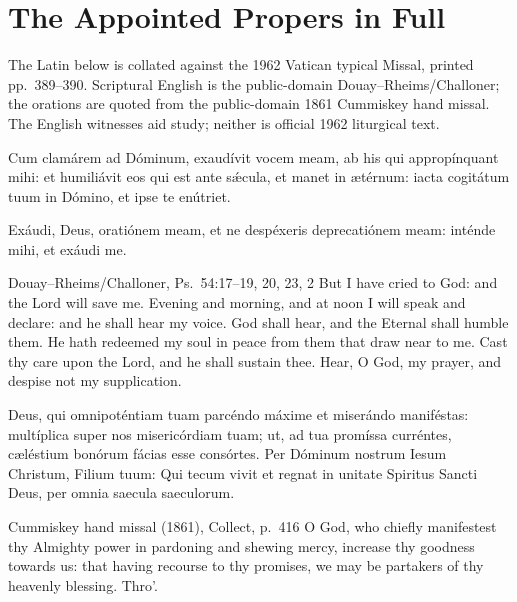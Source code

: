 \section*{The Appointed Propers in Full}

\noindent The Latin below is collated against the 1962 Vatican typical Missal,
printed pp.~389--390. Scriptural English is the public-domain
Douay--Rheims/Challoner; the orations are quoted from the public-domain 1861
Cummiskey hand missal. The English witnesses aid study; neither is official
1962 liturgical text.

Cum clamárem ad Dóminum, exaudívit vocem meam, ab his qui appropínquant mihi:
et humiliávit eos qui est ante s\'{\ae}cula, et manet in ætérnum: iacta cogitátum
tuum in Dómino, et ipse te enútriet.

\medskip\noindent{} Exáudi, Deus, oratiónem meam, et ne despéxeris
deprecatiónem meam: inténde mihi, et exáudi me.
\finishfulltextelement
\begin{fulltextenglish}{Douay--Rheims/Challoner, Ps.~54:17--19, 20, 23, 2}
But I have cried to God: and the Lord will save me. Evening and morning, and
at noon I will speak and declare: and he shall hear my voice. God shall hear,
and the Eternal shall humble them. He hath redeemed my soul in peace from
them that draw near to me. Cast thy care upon the Lord, and he shall sustain
thee. Hear, O God, my prayer, and despise not my supplication.
\end{fulltextenglish}

Deus, qui omnipoténtiam tuam parcéndo máxime et miserándo maniféstas:
multíplica super nos misericórdiam tuam; ut, ad tua promíssa curréntes,
cæléstium bonórum fácias esse consórtes. Per Dóminum nostrum Iesum Christum,
Filium tuum: Qui tecum vivit et regnat in unitate Spiritus Sancti Deus, per
omnia saecula saeculorum.
\finishfulltextelement
\begin{fulltextenglish}{Cummiskey hand missal (1861), Collect, p.~416}
O God, who chiefly manifestest thy Almighty power in pardoning and shewing
mercy, increase thy goodness towards us: that having recourse to thy promises,
we may be partakers of thy heavenly blessing. Thro'.
\end{fulltextenglish}

